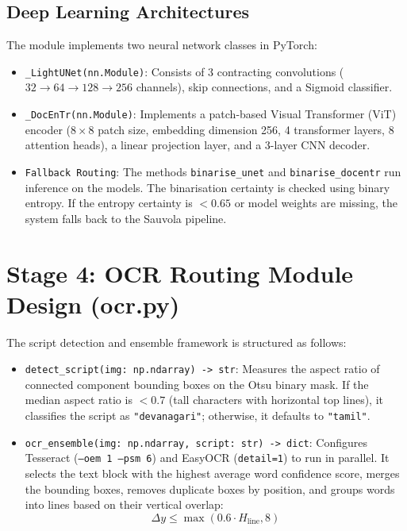 \subsection{Deep Learning Architectures}
The module implements two neural network classes in PyTorch:
\begin{itemize}
	\item \texttt{\_LightUNet(nn.Module)}: Consists of 3 contracting convolutions ($32 \rightarrow 64 \rightarrow 128 \rightarrow 256$ channels), skip connections, and a Sigmoid classifier.
	\item \texttt{\_DocEnTr(nn.Module)}: Implements a patch-based Visual Transformer (ViT) encoder ($8 \times 8$ patch size, embedding dimension 256, 4 transformer layers, 8 attention heads), a linear projection layer, and a 3-layer CNN decoder.
	\item \texttt{Fallback Routing}: The methods \texttt{binarise\_unet} and \texttt{binarise\_docentr} run inference on the models. The binarisation certainty is checked using binary entropy. If the entropy certainty is $< 0.65$ or model weights are missing, the system falls back to the Sauvola pipeline.
\end{itemize}

\section{Stage 4: OCR Routing Module Design (ocr.py)}

The script detection and ensemble framework is structured as follows:

\begin{itemize}
	\item \texttt{detect\_script(img: np.ndarray) -> str}:
	Measures the aspect ratio of connected component bounding boxes on the Otsu binary mask. If the median aspect ratio is $< 0.7$ (tall characters with horizontal top lines), it classifies the script as \texttt{"devanagari"}; otherwise, it defaults to \texttt{"tamil"}.
	
	\item \texttt{ocr\_ensemble(img: np.ndarray, script: str) -> dict}:
	Configures Tesseract (\texttt{--oem 1 --psm 6}) and EasyOCR (\texttt{detail=1}) to run in parallel. It selects the text block with the highest average word confidence score, merges the bounding boxes, removes duplicate boxes by position, and groups words into lines based on their vertical overlap:
	\begin{equation}
	\Delta y \le \max\left(0.6 \cdot H_{\text{line}}, 8\right)
	\end{equation}
\end{itemize}

